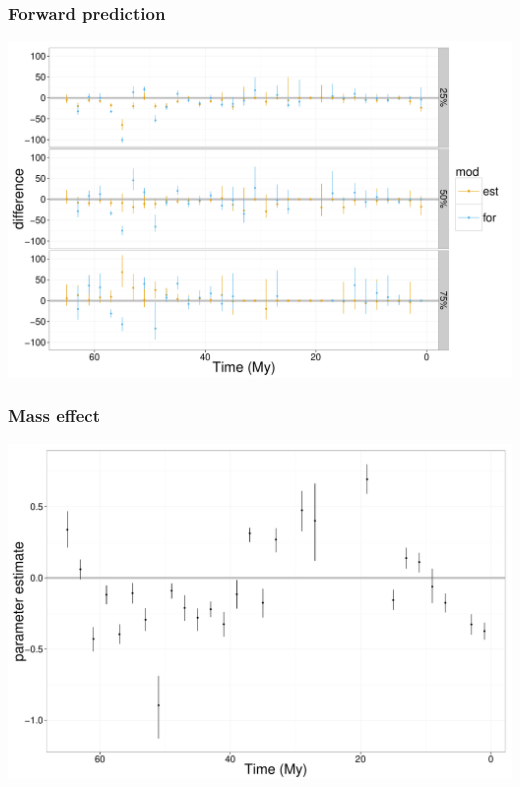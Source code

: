\documentclass{beamer}
\begin{document}

\begin{frame}
  \frametitle{Forward prediction}
  \begin{center}
    \includegraphics[height = 0.8\textheight, width = \textwidth,  keepaspectratio = true]{figure/discrepency}
  \end{center}
\end{frame}

\begin{frame}
  \frametitle{Mass effect}
  \begin{center}
    \includegraphics[height = 0.8\textheight, width = \textwidth,  keepaspectratio = true]{figure/body_est_time}
  \end{center}
\end{frame}
\end{document}
